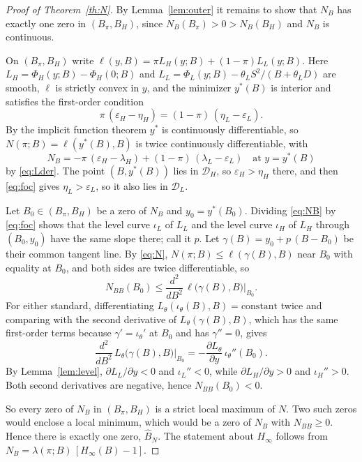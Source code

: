 \documentclass[11pt]{article}
\theoremstyle{definition}
\begin{document}
\begin{proof}[Proof of Theorem~\ref{th:N}]
By Lemma~\ref{lem:outer} it remains to show that $N_B$ has exactly one zero in $(B_\pi,B_H)$, since $N_B(B_\pi)>0>N_B(B_H)$ and $N_B$ is continuous.

On $(B_\pi,B_H)$ write $\ell(y,B)=\pi L_H(y;B)+(1-\pi)L_L(y;B)$. Here $L_H=\Phi_H(y;B)-\Phi_H(0;B)$ and $L_L=\Phi_L(y;B)-\theta_LS^2/(B+\theta_LD)$ are smooth, $\ell$ is strictly convex in $y$, and the minimizer $y^*(B)$ is interior and satisfies the first-order condition
\begin{equation}\label{eq:foc}
\pi\,(\varepsilon_H-\eta_H)=(1-\pi)\,(\eta_L-\varepsilon_L).
\end{equation}
By the implicit function theorem $y^*$ is continuously differentiable, so $N(\pi;B)=\ell(y^*(B),B)$ is twice continuously differentiable, with
\begin{equation}\label{eq:NB}
N_B=-\pi\,(\varepsilon_H-\lambda_H)+(1-\pi)\,(\lambda_L-\varepsilon_L)\quad\text{at }y=y^*(B)
\end{equation}
by \eqref{eq:Lder}. The point $(B,y^*(B))$ lies in $\mathcal D_H$, so $\varepsilon_H>\eta_H$ there, and then \eqref{eq:foc} gives $\eta_L>\varepsilon_L$, so it also lies in $\mathcal D_L$.

Let $B_0\in(B_\pi,B_H)$ be a zero of $N_B$ and $y_0=y^*(B_0)$. Dividing \eqref{eq:NB} by \eqref{eq:foc} shows that the level curve $\iota_L$ of $L_L$ and the level curve $\iota_H$ of $L_H$ through $(B_0,y_0)$ have the same slope there; call it $p$. Let $\gamma(B)=y_0+p\,(B-B_0)$ be their common tangent line. By \eqref{eq:N}, $N(\pi;B)\le\ell(\gamma(B),B)$ near $B_0$ with equality at $B_0$, and both sides are twice differentiable, so
\[
N_{BB}(B_0)\le\frac{d^2}{dB^2}\,\ell\bigl(\gamma(B),B\bigr)\Big|_{B_0}.
\]
For either standard, differentiating $L_\theta(\iota_\theta(B),B)=\text{constant}$ twice and comparing with the second derivative of $L_\theta(\gamma(B),B)$, which has the same first-order terms because $\gamma'=\iota_\theta'$ at $B_0$ and has $\gamma''=0$, gives
\[
\frac{d^2}{dB^2}\,L_\theta\bigl(\gamma(B),B\bigr)\Big|_{B_0}=-\frac{\partial L_\theta}{\partial y}\,\iota_\theta''(B_0).
\]
By Lemma~\ref{lem:level}, $\partial L_L/\partial y<0$ and $\iota_L''<0$, while $\partial L_H/\partial y>0$ and $\iota_H''>0$. Both second derivatives are negative, hence $N_{BB}(B_0)<0$.

So every zero of $N_B$ in $(B_\pi,B_H)$ is a strict local maximum of $N$. Two such zeros would enclose a local minimum, which would be a zero of $N_B$ with $N_{BB}\ge0$. Hence there is exactly one zero, $\hat B_N$. The statement about $H_\infty$ follows from $N_B=\lambda(\pi;B)\,[H_\infty(B)-1]$.
\end{proof}
\end{document}
